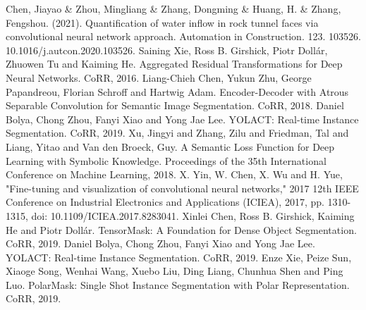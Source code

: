 \documentclass[10pt,twocolumn,letterpaper]{article}
\begin{document}
\begin{thebibliography}{1}
Chen, Jiayao \& Zhou, Mingliang \& Zhang, Dongming \& Huang, H. \& Zhang, Fengshou. (2021).
Quantification of water inflow in rock tunnel faces via convolutional neural network approach. Automation in Construction. 123. 103526. 10.1016/j.autcon.2020.103526. 
Saining Xie, Ross B. Girshick, Piotr Doll\'ar, Zhuowen Tu and Kaiming He.
Aggregated Residual Transformations for Deep Neural Networks. CoRR, 2016.
Liang-Chieh Chen, Yukun Zhu, George Papandreou, Florian Schroff and Hartwig Adam.
Encoder-Decoder with Atrous Separable Convolution for Semantic Image Segmentation. CoRR, 2018.
Daniel Bolya, Chong Zhou, Fanyi Xiao and Yong Jae Lee.
YOLACT: Real-time Instance Segmentation. CoRR, 2019.
Xu, Jingyi and Zhang, Zilu and Friedman, Tal and Liang, Yitao and Van den Broeck, Guy.
A Semantic Loss Function for Deep Learning with Symbolic Knowledge. Proceedings of the 35th International Conference on Machine Learning, 2018.
X. Yin, W. Chen, X. Wu and H. Yue, "Fine-tuning and visualization of convolutional neural networks," 2017 12th IEEE Conference on Industrial Electronics and Applications (ICIEA), 2017, pp. 1310-1315, doi: 10.1109/ICIEA.2017.8283041.
Xinlei Chen, Ross B. Girshick, Kaiming He and Piotr Doll\'ar.
TensorMask: A Foundation for Dense Object Segmentation. CoRR, 2019.
Daniel Bolya, Chong Zhou, Fanyi Xiao and Yong Jae Lee.
YOLACT: Real-time Instance Segmentation. CoRR, 2019.
Enze Xie, Peize Sun, Xiaoge Song, Wenhai Wang, Xuebo Liu, Ding Liang, Chunhua Shen and Ping Luo.
PolarMask: Single Shot Instance Segmentation with Polar Representation. CoRR, 2019.

\end{thebibliography}
\end{document}
